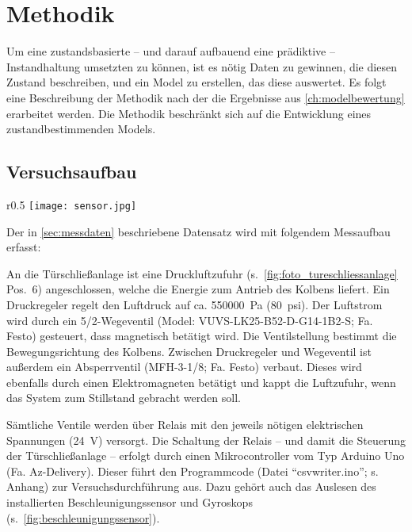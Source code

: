 \chapter{Methodik}
\label{ch:methodik}
Um eine zustandsbasierte -- und darauf aufbauend eine prädiktive -- Instandhaltung umsetzten zu können, ist es nötig Daten zu gewinnen, die diesen Zustand beschreiben, und ein Model zu erstellen, das diese auswertet. Es folgt eine Beschreibung der Methodik nach der die Ergebnisse aus \cref{ch:modelbewertung} erarbeitet werden. Die Methodik beschränkt sich auf die Entwicklung eines zustandbestimmenden Models.
\section{Versuchsaufbau}
\label{sec:versuchsaufbau}
\begin{wrapfigure}{r}{0.5\textwidth}
	\centering
	\texttt{[image: sensor.jpg]}
	\caption{An Türschließanlage befestigter Beschleunigungssensor}
	\label{fig:beschleunigungssensor}
\end{wrapfigure}

Der in \cref{sec:messdaten} beschriebene Datensatz wird mit folgendem Messaufbau erfasst:

An die Türschließanlage ist eine Druckluftzufuhr (s.~\cref{fig:foto_tureschliessanlage} Pos.~6) angeschlossen, welche die Energie zum Antrieb des Kolbens liefert. Ein Druckregeler regelt den Luftdruck auf ca. \SI{550000}{\pascal} (\SI{80}{psi}). Der Luftstrom wird durch ein 5/2-Wegeventil (Model: VUVS-LK25-B52-D-G14-1B2-S; Fa. Festo) gesteuert, dass magnetisch betätigt wird. Die Ventilstellung bestimmt die Bewegungsrichtung des Kolbens. Zwischen Druckregeler und Wegeventil ist außerdem ein Absperrventil (MFH-3-1/8; Fa. Festo) verbaut. Dieses wird ebenfalls durch einen Elektromagneten betätigt und kappt die Luftzufuhr, wenn das System zum Stillstand gebracht werden soll.

Sämtliche Ventile werden über Relais mit den jeweils nötigen elektrischen Spannungen (\SI{24}{\volt}) versorgt. Die Schaltung der Relais -- und damit die Steuerung der Türschließanlage -- erfolgt durch einen Mikrocontroller vom Typ Arduino Uno (Fa. Az-Delivery). Dieser führt den Programmcode (Datei \enquote{csvwriter.ino}; s. Anhang) zur Versuchsdurchführung aus.  Dazu gehört auch das Auslesen des installierten Beschleunigungssensor und Gyroskops (s.~\cref{fig:beschleunigungssensor}). 

